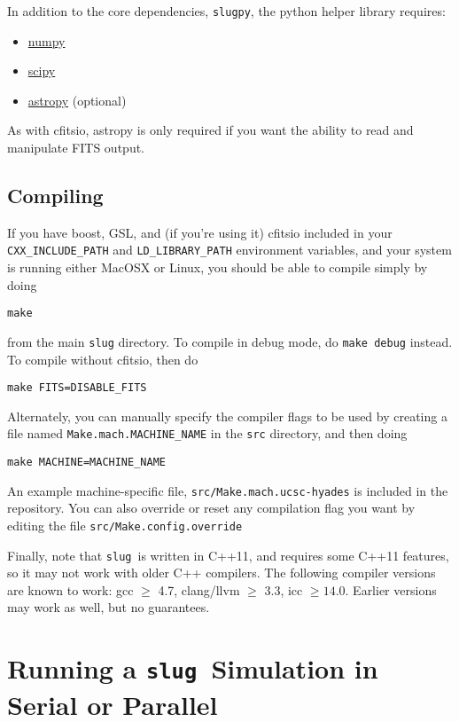 \documentclass[12pt]{article}
\newcommand{\slug}{\texttt{slug}}
\newcommand{\slugpy}{\texttt{slugpy}}
\begin{document}
In addition to the core dependencies, \slugpy, the python helper library requires:
\begin{itemize}
\item \href{http://www.numpy.org/}{numpy}
\item \href{http://www.scipy.org/}{scipy}
\item \href{http://www.astropy.org/}{astropy} (optional)
\end{itemize}
As with cfitsio, astropy is only required if you want the ability to read and manipulate FITS output. 

\subsection{Compiling}

If you have boost, GSL, and (if you're using it) cfitsio included in your \verb=CXX_INCLUDE_PATH= and \verb=LD_LIBRARY_PATH= environment variables, and your system is running either MacOSX or Linux, you should be able to compile simply by doing
\begin{verbatim}
make
\end{verbatim}
from the main \verb=slug= directory. To compile in debug mode, do \verb=make debug= instead. To compile without cfitsio, then do
\begin{verbatim}
make FITS=DISABLE_FITS
\end{verbatim}

Alternately, you can manually specify the compiler flags to be used by creating a file named \verb=Make.mach.MACHINE_NAME= in the \verb=src= directory, and then doing
\begin{verbatim}
make MACHINE=MACHINE_NAME
\end{verbatim}
An example machine-specific file, \verb=src/Make.mach.ucsc-hyades= is included in the repository. You can also override or reset any compilation flag you want by editing the file \verb=src/Make.config.override=

Finally, note that \slug\ is written in C++11, and requires some C++11 features, so it may not work with older C++ compilers. The following compiler versions are known to work: gcc $\geq$ 4.7, clang/llvm $\geq$ 3.3, icc $\geq 14.0$. Earlier versions may work as well, but no guarantees.

\section{Running a \slug\ Simulation in Serial or Parallel}
\end{document}
